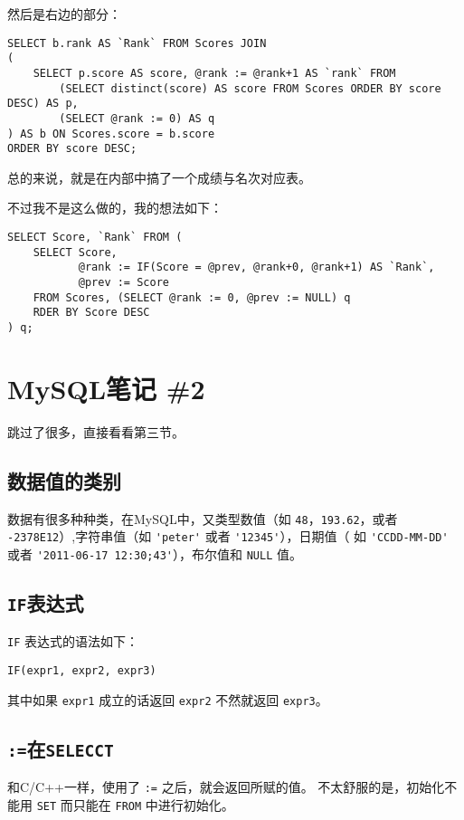 然后是右边的部分：
\begin{lstlisting}
SELECT b.rank AS `Rank` FROM Scores JOIN
(
    SELECT p.score AS score, @rank := @rank+1 AS `rank` FROM
        (SELECT distinct(score) AS score FROM Scores ORDER BY score DESC) AS p,
        (SELECT @rank := 0) AS q
) AS b ON Scores.score = b.score
ORDER BY score DESC;
\end{lstlisting}

总的来说，就是在内部中搞了一个成绩与名次对应表。

不过我不是这么做的，我的想法如下：
\begin{lstlisting}
SELECT Score, `Rank` FROM (
    SELECT Score,
           @rank := IF(Score = @prev, @rank+0, @rank+1) AS `Rank`,
           @prev := Score
    FROM Scores, (SELECT @rank := 0, @prev := NULL) q
    RDER BY Score DESC
) q;
\end{lstlisting}


\section{MySQL笔记 \#2}

跳过了很多，直接看看第三节。

\subsection{数据值的类别}

数据有很多种种类，在MySQL中，又类型数值（如 \verb|48|，\verb|193.62|，或者 %
\verb|-2378E12|）,字符串值（如 \verb|'peter'| 或者 \verb|'12345'|），日期值（
如 \verb|'CCDD-MM-DD'| 或者 \verb|'2011-06-17 12:30;43'|），布尔值和 \verb|NULL| %
值。

\subsection{{\tt IF}表达式}

\verb|IF| 表达式的语法如下：
\begin{lstlisting}
IF(expr1, expr2, expr3)
\end{lstlisting}

其中如果 \verb|expr1| 成立的话返回 \verb|expr2| 不然就返回 \verb|expr3|。

\subsection{{\tt :=}在{\tt SELECCT}}

和C/C++一样，使用了 \verb|:=| 之后，就会返回所赋的值。
不太舒服的是，初始化不能用 \verb|SET| 而只能在 \verb|FROM| 中进行初始化。

